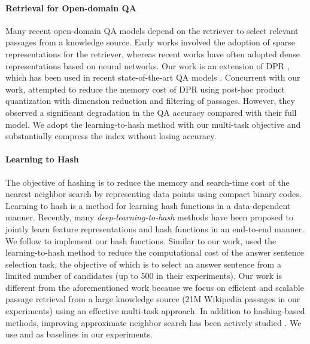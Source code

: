 \documentclass[11pt,a4paper]{article}
\begin{document}
\paragraph{Retrieval for Open-domain QA}

Many recent open-domain QA models depend on the retriever to select relevant passages from a knowledge source.
Early works involved the adoption of sparse representations \cite{Chen2017ReadingQuestions} for the retriever, whereas recent works \cite{Lee2019LatentAnswering,Guu2020,Karpukhin2020DenseAnswering} have often adopted dense representations based on neural networks.
Our work is an extension of DPR \cite{Karpukhin2020DenseAnswering}, which has been used in recent state-of-the-art QA models \cite{Lewis2020Retrieval-augmentedTasks,Izacard2020LeveragingAnswering}.
Concurrent with our work, \citet{Izacard2020AAnswering} attempted to reduce the memory cost of DPR using post-hoc product quantization with dimension reduction and filtering of passages.
However, they observed a significant degradation in the QA accuracy compared with their full model.
We adopt the learning-to-hash method with our multi-task objective and substantially compress the index without losing accuracy.

\paragraph{Learning to Hash}
The objective of hashing is to reduce the memory and search-time cost of the nearest neighbor search by representing data points using compact binary codes.
Learning to hash \cite{Wang2016LearningSurvey,Wang2018AHash} is a method for learning hash functions in a data-dependent manner.
Recently, many \textit{deep-learning-to-hash} methods have been proposed \cite{Lai2015SimultaneousNetworks,Zhu2016DeepRetrieval,Li2016FeatureLabels,Cao2017HashNet:Continuation,Cao2018HashGAN:GAN} to jointly learn feature representations and hash functions in an end-to-end manner.
We follow \citet{Cao2017HashNet:Continuation} to implement our hash functions.
Similar to our work, \citet{Xu2020HashingSelection} used the learning-to-hash method to reduce the computational cost of the answer sentence selection task, the objective of which is to select an answer sentence from a limited number of candidates (up to 500 in their experiments).
Our work is different from the aforementioned work because we focus on efficient and scalable passage retrieval from a large knowledge source (21M Wikipedia passages in our experiments) using an effective multi-task approach.
In addition to hashing-based methods, improving approximate neighbor search has been actively studied \cite{Jegou2011ProductSearch,Malkov2020EfficientGraphs,Guo2020AcceleratingQuantization}. We use \citet{Jegou2011ProductSearch} and \citet{Malkov2020EfficientGraphs} as baselines in our experiments.
\end{document}
